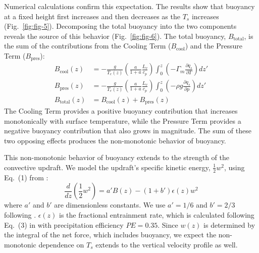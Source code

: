\documentclass{ametsocV6.1}
\begin{document}
Numerical calculations confirm this expectation. The results show that buoyancy at a fixed height first increases and then decreases as the $T_s$ increases (Fig.~\ref{fig:fig-5}). Decomposing the total buoyancy into the two components reveals the source of this behavior (Fig.~\ref{fig:fig-6}). The total buoyancy, $B_{\text{total}}$, is the sum of the contributions from the Cooling Term ($B_{\text{cool}}$) and the Pressure Term ($B_{\text{pres}}$):
\begin{align}
B_{\text{cool}}(z) &= -\frac{g}{T_e(z)} \left( \frac{a}{1+a} \frac{L_v}{c_p} \right) \int_0^z \left(-\Gamma_m \frac{\partial q_s}{\partial T}\right) dz' \label{eq:b_cool} \\
B_{\text{pres}}(z) &= -\frac{g}{T_e(z)} \left( \frac{a}{1+a} \frac{L_v}{c_p} \right) \int_0^z \left(-\rho g \frac{\partial q_s}{\partial p}\right) dz' \label{eq:b_pres} \\
B_{\text{total}}(z) &= B_{\text{cool}}(z) + B_{\text{pres}}(z) \label{eq:b_total}
\end{align}
The Cooling Term provides a positive buoyancy contribution that increases monotonically with surface temperature, while the Pressure Term provides a negative buoyancy contribution that also grows in magnitude. The sum of these two opposing effects produces the non-monotonic behavior of buoyancy.

This non-monotonic behavior of buoyancy extends to the strength of the convective updraft. We model the updraft's specific kinetic energy, $\frac{1}{2}w^2$, using Eq.~(1) from \cite{delgenio2007}:
\begin{equation}
\frac{d}{dz}\left(\frac{1}{2}w^2\right)=a'B(z)-(1+b')\epsilon(z)w^2 \label{eq:momentum}
\end{equation}
where $a'$ and $b'$ are dimensionless constants. We use $a'=1/6$ and $b'=2/3$ following \cite{delgenio2007}. $\epsilon(z)$ is the fractional entrainment rate, which is calculated following Eq.~(3) in \cite{romps2016} with precipitation efficiency $PE=0.35$. Since $w(z)$ is determined by the integral of the net force, which includes buoyancy, we expect the non-monotonic dependence on $T_s$ extends to the vertical velocity profile as well.
\end{document}
